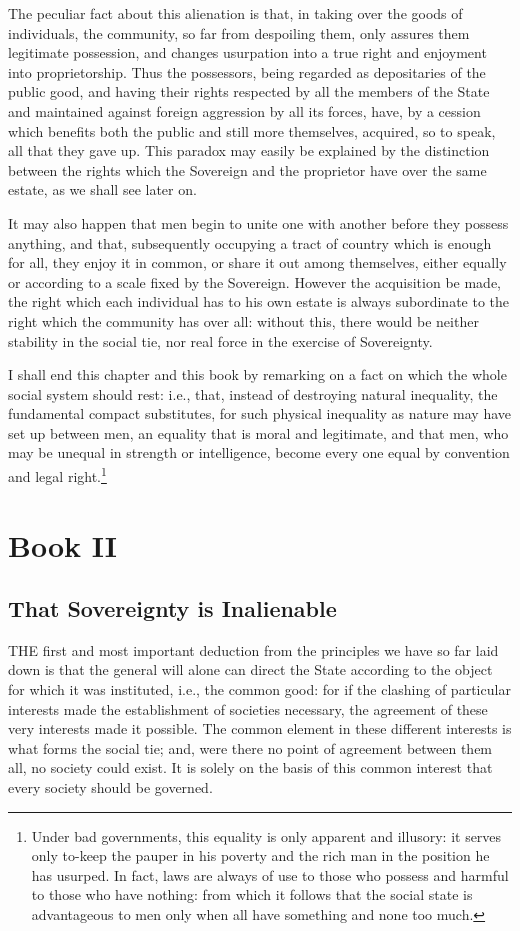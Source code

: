 \documentclass[12pt]{book}
\newcommand{\mychapter}[2]{
\setcounter{chapter}{#1}
    \setcounter{section}{0}
    \chapter*{#2}
    \addcontentsline{toc}{chapter}{#2}
}
\begin{document}
The peculiar fact about this alienation is that, in taking over the goods of individuals, the community, so far from despoiling them, only assures them legitimate possession, and changes usurpation into a true right and enjoyment into proprietorship. Thus the possessors, being regarded as depositaries of the public good, and having their rights respected by all the members of the State and maintained against foreign aggression by all its forces, have, by a cession which benefits both the public and still more themselves, acquired, so to speak, all that they gave up. This paradox may easily be explained by the distinction between the rights which the Sovereign and the proprietor have over the same estate, as we shall see later on.

It may also happen that men begin to unite one with another before they possess anything, and that, subsequently occupying a tract of country which is enough for all, they enjoy it in common, or share it out among themselves, either equally or according to a scale fixed by the Sovereign. However the acquisition be made, the right which each individual has to his own estate is always subordinate to the right which the community has over all: without this, there would be neither stability in the social tie, nor real force in the exercise of Sovereignty.

I shall end this chapter and this book by remarking on a fact on which the whole social system should rest: i.e., that, instead of destroying natural inequality, the fundamental compact substitutes, for such physical inequality as nature may have set up between men, an equality that is moral and legitimate, and that men, who may be unequal in strength or intelligence, become every one equal by convention and legal right.\footnote{Under bad governments, this equality is only apparent and illusory: it serves only to-keep the pauper in his poverty and the rich man in the position he has usurped. In fact, laws are always of use to those who possess and harmful to those who have nothing: from which it follows that the social state is advantageous to men only when all have something and none too much.}

\mychapter{2}{Book II}
\section{That Sovereignty is Inalienable}
THE first and most important deduction from the principles we have so far laid down is that the general will alone can direct the State according to the object for which it was instituted, i.e., the common good: for if the clashing of particular interests made the establishment of societies necessary, the agreement of these very interests made it possible. The common element in these different interests is what forms the social tie; and, were there no point of agreement between them all, no society could exist. It is solely on the basis of this common interest that every society should be governed.
\end{document}
